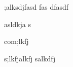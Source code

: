 ;alksdjfasd
fas
dfasdf

\begin{comment}
;skjdf
\end{comment}

asldkja s

com;lkfj

s;lkfjalkfj
salkdfj 
